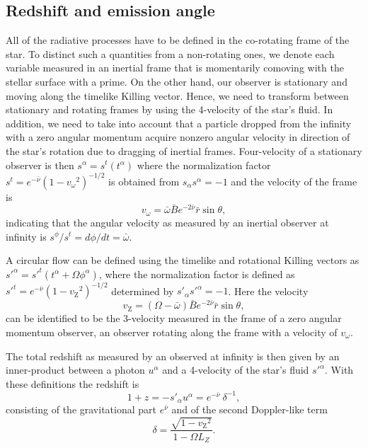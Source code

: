 \documentclass[iop, usenatbib]{emulateapj}
\newcommand{\be}{\begin{equation}}
\newcommand{\ee}{\end{equation}}
\newcommand{\rb}{\ensuremath{\bar{r}}}
\newcommand{\wb}{\ensuremath{\bar{\omega}}}
\newcommand{\nub}{\ensuremath{\bar{\nu}}}
\newcommand{\Bb}{\ensuremath{\bar{B}}}
\newcommand{\vw}{\ensuremath{v_{\omega}}}
\newcommand{\vz}{\ensuremath{v_{\mathrm{Z}}}}
\begin{document}
\subsection{Redshift and emission angle}
All of the radiative processes have to be defined in the co-rotating frame of the star.
To distinct such a quantities from a non-rotating ones, we denote each variable measured in an inertial frame that is momentarily comoving with the stellar surface with a prime.
On the other hand, our observer is stationary and moving along the timelike Killing vector.
Hence, we need to transform between stationary and rotating frames by using the 4-velocity of the star's fluid.
In addition, we need to take into account that a particle dropped from the infinity with a zero angular momentum acquire nonzero angular velocity in direction of the star's rotation due to dragging of inertial frames.
Four-velocity of a stationary observer is then $s^{\alpha} = s^t(t^{\alpha})$ where the normalization factor $s^t = e^{-\nub}(1-\vw^2)^{-1/2}$ is obtained from $s_{\alpha}s^{\alpha} = -1$ and the velocity of the frame is 
\be
\vw = \wb \Bb e^{-2\nub} \rb \sin\theta,
\ee
indicating that the angular velocity as measured by an inertial observer at infinity is $s^{\phi} / s^{t} = d\phi/dt = \wb$.

A circular flow can be defined using the timelike and rotational Killing vectors as $s'^{\alpha} = s'^t (t^{\alpha} + \Omega \phi^{\alpha})$, where the normalization factor is defined as $s'^t = e^{-\nub} (1 - \vz^2)^{-1/2}$ determined by $s'_{\alpha}s'^{\alpha} = -1$.
Here the velocity 
\be
\vz = (\Omega - \wb) \Bb e^{-2\nub} \rb \sin\theta,
\ee
can be identified to be the 3-velocity measured in the frame of a zero angular momentum observer, an observer rotating along the frame with a velocity of $\vw$.

The total redshift as measured by an observed at infinity is then given by an inner-product between a photon $u^{\alpha}$ and a 4-velocity of the star's fluid $s'^{\alpha}$.
With these definitions the redshift is
\be
1 + z = -s'_{\alpha} u^{\alpha} = e^{-\nub} ~\delta^{-1},
\ee
consisting of the gravitational part $e^{\nub}$ and of the second Doppler-like term
\be
\delta = \frac{\sqrt{1-\vz^2}}{1 - \Omega L_Z}.
\ee
\end{document}
